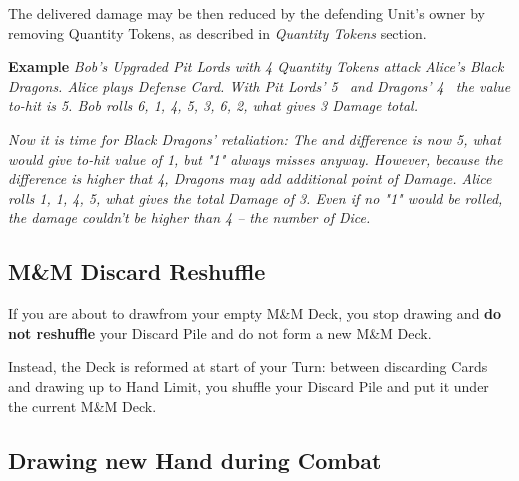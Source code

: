 \begin{multicols*}{2}
    The delivered damage may be then reduced by the defending Unit's owner by removing Quantity Tokens, as described in \textit{Quantity Tokens} section.
    
    
    \textbf{Example} \textit{Bob's Upgraded Pit Lords with 4 Quantity Tokens attack Alice's Black Dragons. Alice plays Defense Card. With Pit Lords' 5~ and Dragons' 4~ the value to-hit is 5. Bob rolls 6, 1, 4, 5, 3, 6, 2, what gives 3 Damage total.}
        
    \textit{Now it is time for Black Dragons' retaliation: The  and  difference is now 5, what would give \mbox{to-hit} value of 1, but "1" always misses anyway. However, because the difference is higher that 4, Dragons may add additional point of Damage. Alice rolls 1, 1, 4, 5, what gives the total Damage of 3. Even if no "1" would be rolled, the damage couldn't be higher than 4 -- the number of Dice.}
    
    \subsection*{M\&M Discard Reshuffle}
    
    If you are about to drawfrom your empty M\&M Deck, you stop drawing and \textbf{do not reshuffle} your Discard Pile and do not form a new M\&M Deck.
    
    Instead, the Deck is reformed at start of your Turn: between discarding Cards and drawing up to Hand Limit, you shuffle your Discard Pile and put it under the current M\&M Deck. 
    
    \subsection*{Drawing new Hand during Combat}
    

\end{multicols*}
